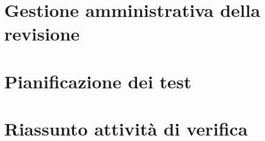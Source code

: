 \newpage
\section{Gestione amministrativa della revisione}


\newpage
\section{Pianificazione dei test}


\appendix

\newpage
\section{Riassunto attività di verifica}





